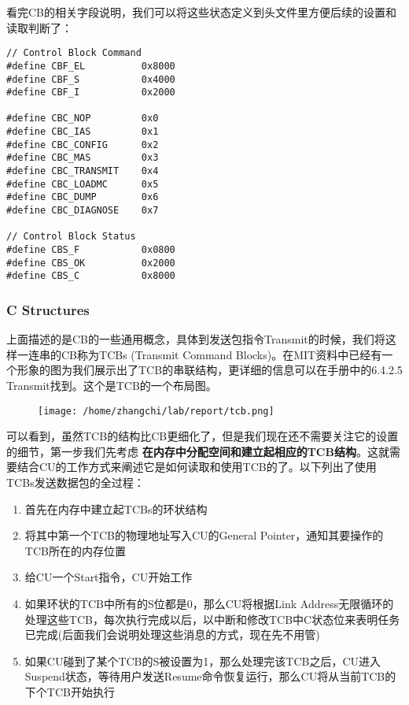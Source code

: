 \documentclass{article}
\newcommand{\highlight}[1]{{\bfseries \color{red}  #1}}
\begin{document}
\begin{CJK*}{UTF8}{gkai}
看完CB的相关字段说明，我们可以将这些状态定义到头文件里方便后续的设置和读取判断了：

\begin{lstlisting}[style=ccode, title={\scriptsize \ttfamily \bfseries kern/e100.h}]
// Control Block Command
#define CBF_EL          0x8000
#define CBF_S           0x4000
#define CBF_I           0x2000

#define CBC_NOP         0x0
#define CBC_IAS         0x1
#define CBC_CONFIG      0x2
#define CBC_MAS         0x3
#define CBC_TRANSMIT    0x4
#define CBC_LOADMC      0x5
#define CBC_DUMP        0x6
#define CBC_DIAGNOSE    0x7

// Control Block Status
#define CBS_F           0x0800
#define CBS_OK          0x2000
#define CBS_C           0x8000
\end{lstlisting}

\subsubsection{C Structures}


上面描述的是CB的一些通用概念，具体到发送包指令Transmit的时候，我们将这样一连串的CB称为TCBs (Transmit Command Blocks)。在MIT资料中已经有一个形象的图为我们展示出了TCB的串联结构，更详细的信息可以在手册中的6.4.2.5 Transmit找到。这个是TCB的一个布局图。

\begin{figure}[htp]
\centering
\texttt{[image: /home/zhangchi/lab/report/tcb.png]}
\end{figure}

可以看到，虽然TCB的结构比CB更细化了，但是我们现在还不需要关注它的设置的细节，第一步我们先考虑\highlight{在内存中分配空间和建立起相应的TCB结构}。这就需要结合CU的工作方式来阐述它是如何读取和使用TCB的了。以下列出了使用TCBs发送数据包的全过程：

\begin{enumerate}
\item{首先在内存中建立起TCBs的环状结构}
\item{将其中第一个TCB的物理地址写入CU的General Pointer，通知其要操作的TCB所在的内存位置}
\item{给CU一个Start指令，CU开始工作}
\item{如果环状的TCB中所有的S位都是0，那么CU将根据Link Address无限循环的处理这些TCB，每次执行完成以后，以中断和修改TCB中C状态位来表明任务已完成(后面我们会说明处理这些消息的方式，现在先不用管)}
\item{如果CU碰到了某个TCB的S被设置为1，那么处理完该TCB之后，CU进入Suspend状态，等待用户发送Resume命令恢复运行，那么CU将从当前TCB的下个TCB开始执行}
\end{enumerate}



\end{CJK*}
\end{document}
